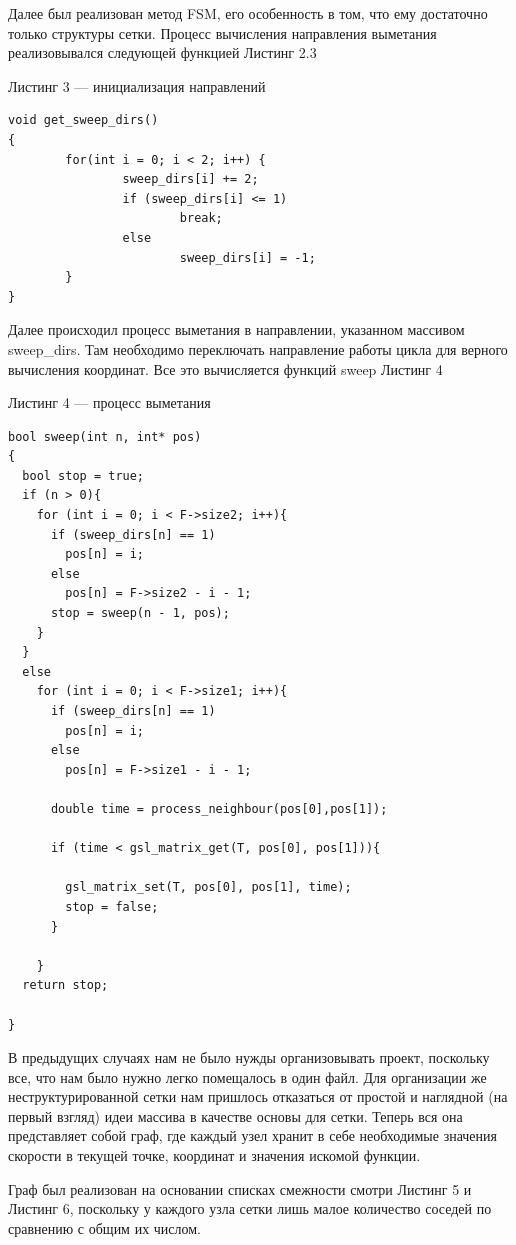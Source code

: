 Далее был реализован метод FSM, его особенность в том, что ему
достаточно только структуры сетки. Процесс вычисления направления
выметания реализовывался следующей функцией Листинг 2.3

\vspace{1em}
Листинг 3 --- инициализация направлений
\normalsize
\begin{verbatim} 
void get_sweep_dirs()
{
        for(int i = 0; i < 2; i++) {
                sweep_dirs[i] += 2;
                if (sweep_dirs[i] <= 1)
                        break;
                else
                        sweep_dirs[i] = -1;
        }
}

\end{verbatim}
\large

Далее происходил процесс выметания в направлении, указанном массивом
sweep\_dirs. Там необходимо переключать направление работы цикла для
верного вычисления координат. Все это вычисляется функций sweep
Листинг 4


\vspace{1em}
Листинг 4 --- процесс выметания
\normalsize
\begin{verbatim} 
bool sweep(int n, int* pos)
{
  bool stop = true;
  if (n > 0){
    for (int i = 0; i < F->size2; i++){
      if (sweep_dirs[n] == 1)
        pos[n] = i;
      else
        pos[n] = F->size2 - i - 1;
      stop = sweep(n - 1, pos);
    }
  }
  else
    for (int i = 0; i < F->size1; i++){
      if (sweep_dirs[n] == 1)
        pos[n] = i;
      else
        pos[n] = F->size1 - i - 1;

      double time = process_neighbour(pos[0],pos[1]);

      if (time < gsl_matrix_get(T, pos[0], pos[1])){
               
        gsl_matrix_set(T, pos[0], pos[1], time);
        stop = false;
      } 

    }
  return stop;

}
\end{verbatim}
\large

В предыдущих случаях нам не было нужды организовывать проект,
поскольку все, что нам было нужно легко помещалось в один файл. Для
организации же неструктурированной сетки нам пришлось отказаться от
простой и наглядной (на первый взгляд) идеи массива в качестве основы
для сетки. Теперь вся она представляет собой граф, где каждый узел
хранит в себе необходимые значения скорости в текущей точке, координат
и значения искомой функции.

Граф был реализован на основании списках смежности смотри Листинг 5
и Листинг 6, поскольку у
каждого узла сетки лишь малое количество соседей по сравнению с общим
их числом.

